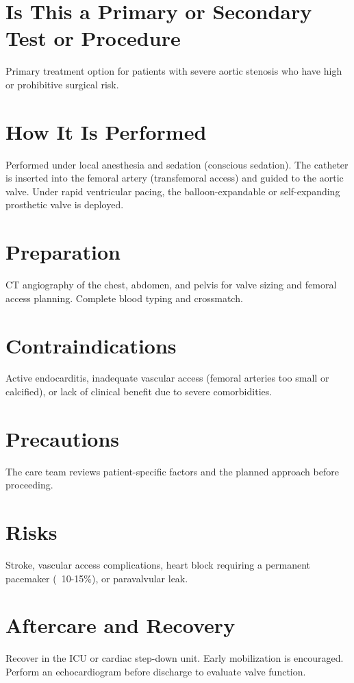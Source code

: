 \section*{Is This a Primary or Secondary Test or Procedure}
Primary treatment option for patients with severe aortic stenosis who have high or prohibitive surgical risk.

\section*{How It Is Performed}
Performed under local anesthesia and sedation (conscious sedation). The catheter is inserted into the femoral artery (transfemoral access) and guided to the aortic valve. Under rapid ventricular pacing, the balloon-expandable or self-expanding prosthetic valve is deployed.

\section*{Preparation}
CT angiography of the chest, abdomen, and pelvis for valve sizing and femoral access planning. Complete blood typing and crossmatch.

\section*{Contraindications}
Active endocarditis, inadequate vascular access (femoral arteries too small or calcified), or lack of clinical benefit due to severe comorbidities.

\section*{Precautions}
The care team reviews patient-specific factors and the planned approach before proceeding.

\section*{Risks}
Stroke, vascular access complications, heart block requiring a permanent pacemaker (~10-15\%), or paravalvular leak.

\section*{Aftercare and Recovery}
Recover in the ICU or cardiac step-down unit. Early mobilization is encouraged. Perform an echocardiogram before discharge to evaluate valve function.

